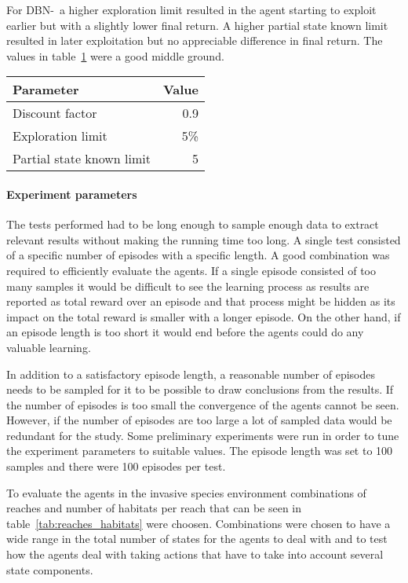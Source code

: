 For DBN-\etre\ a higher exploration limit resulted in the agent starting to
exploit earlier but with a slightly lower final return. A higher partial state
known limit resulted in later exploitation but no appreciable difference in
final return. The values in table~\ref{tab:dbne3_params} were a good middle
ground.

\begin{table}[H]
\label{tab:dbne3_params}
\centering
\begin{tabular}{lr}
 \toprule
 Parameter & Value \\
 \midrule
 Discount factor & 0.9 \\
 Exploration limit & 5\% \\
 Partial state known limit & 5 \\
 \bottomrule
\end{tabular}
\end{table}

\paragraph{Experiment parameters}

The tests performed had to be long enough to sample enough data to extract
relevant results without making the running time too long. A single test
consisted of a specific number of episodes with a specific length. A good
combination was required to efficiently evaluate the agents. If a single
episode consisted of too many samples it would be difficult to see the learning
process as results are reported as total reward over an episode and that
process might be hidden as its impact on the total reward is smaller with a
longer episode. On the other hand, if an episode length is too short it would
end before the agents could do any valuable learning.

In addition to a satisfactory episode length, a reasonable number of episodes
needs to be sampled for it to be possible to draw conclusions from the results.
If the number of episodes is too small the convergence of the agents cannot be
seen. However, if the number of episodes are too large a lot of sampled data
would be redundant for the study. Some preliminary experiments were run in
order to tune the experiment parameters to suitable values. The episode length
was set to 100 samples and there were 100 episodes per test.

To evaluate the agents in the invasive species environment combinations of
reaches and number of habitats per reach that can be seen in
table~\ref{tab:reaches_habitats} were choosen. Combinations were chosen to have
a wide range in the total number of states for the agents to deal with and to
test how the agents deal with taking actions that have to take into account
several state components.

